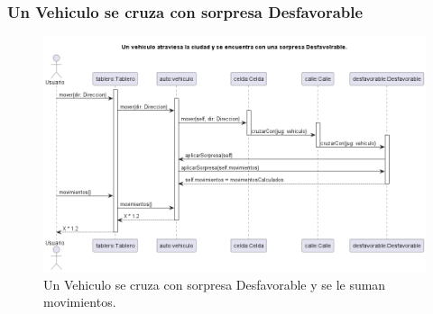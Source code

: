 \documentclass[titlepage,a4paper]{article}
\begin{document}
\subsubsection[Un Vehiculo se cruza con sorpresa Desfavorable]{Un Vehiculo se cruza con sorpresa Desfavorable}

\begin{figure}[H]
  \centering
  \includegraphics[width=1\textwidth]{diagramas/SecuenciaVehiculoCruzaSorpresaDesfavorable.png}
  \caption{\label{fig:class01}Un Vehiculo se cruza con sorpresa Desfavorable y se le suman movimientos.}
\end{figure}
\end{document}
